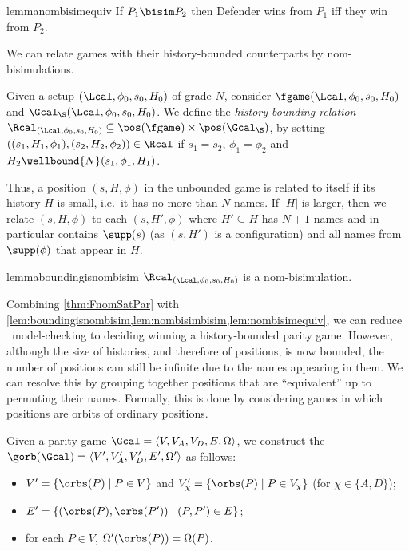 \begin{restatable}{lemma}{nombisimequiv}\label{lem:nombisimequiv}
If $P_1\bisim P_2$ then Defender wins from $P_1$ iff they win from $P_2$.
\end{restatable}


We can relate games with their history-bounded counterparts by nom-bisimulations.


\begin{definition}\label{def:theFreshRelation}
Given a setup $(\Lcal,\phi_0,s_0,H_0)$ of grade $N$, consider $\fgame(\Lcal, \phi_0,s_0, H_0)$  and $\Gcal_\S(\Lcal, \phi_0, s_0, H_0)$.
We define the \emph{history-bounding relation} $\Rcal_{(\Lcal, \phi_0, s_0, H_0)} \subseteq \pos(\fgame) \times \pos(\Gcal_\S)$, by setting $((s_1, H_1, \phi_1), (s_2, H_2, \phi_2)) \in \Rcal$ if $s_1 = s_2$, $\phi_1 = \phi_2$ and $H_2\wellbound{N}(s_1,\phi_1,H_1)$.
                \end{definition}

Thus, a position $(s,H,\phi)$ in the unbounded game is related to itself if its history $H$ is small, i.e.\ it has no more than $N$ names. If $|H|$ is larger, then we relate $(s,H,\phi)$ to each $(s,H',\phi)$ where $H'\subseteq H$ has $N+1$ names and in particular contains $\supp(s)$ (as $(s,H')$ is a configuration) and all names from $\supp(\phi)$ that appear in $H$. 



\begin{restatable}{lemma}{boundingisnombisim}\label{lem:boundingisnombisim}
                                $\Rcal_{(\Lcal, \phi_0, s_0, H_0)}$ is a nom-bisimulation.
\end{restatable}

Combining \cref{thm:FnomSatPar} with \cref{lem:boundingisnombisim,lem:nombisimbisim,lem:nombisimequiv}, we can reduce \fhml\ model-checking to deciding winning a history-bounded parity game. However,
although the size of histories, and therefore of positions, is now bounded, the number of positions can still be infinite due to the names appearing in them. We can resolve this by grouping together positions that are ``equivalent'' up to permuting their names. Formally, this is done by considering games in which positions are orbits of ordinary positions.


\begin{definition} 
    Given a parity game $\Gcal=\langle V,V_A,V_D,E,\Omega\rangle$, 
    we construct the  $\gorb(\Gcal)=\langle V',V_A',V_D',E',\Omega'\rangle$ as follows:
    \begin{itemize}
    \item $V' = \{\orbs(P) \mid P \in V\}$ and $V_\chi'=\{\orbs(P) \mid P \in V_\chi\}$ (for $\chi\in\{A,D\}$);
      \item $E'=\{(\orbs(P),\orbs(P'))\mid (P,P')\in E\}$;
        \item  for each $P\in V$, $\Omega'(\orbs(P)) = \Omega(P)$. 
    \end{itemize}
\end{definition}

